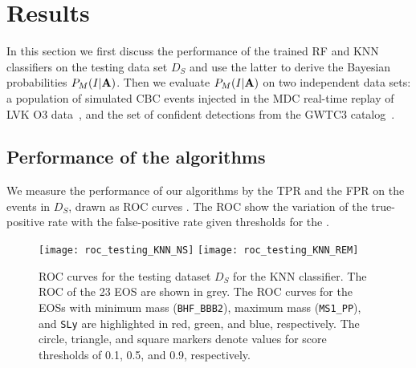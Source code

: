 \section{Results} \label{results}
In this section we first discuss the performance of the trained \ac{RF} and
\ac{KNN} classifiers on the testing data set $D_S$ and use the latter to derive
the Bayesian probabilities $P_M(I|{\bf A})$. Then we evaluate $P_M(I|{\bf A})$ on two independent data sets: a population of simulated \ac{CBC} events injected in the \ac{MDC} real-time replay of \ac{LVK} \ac{O3} data~\cite{Chaudhary:2023vec}, and the set of confident detections from the \ac{GWTC3} catalog~\cite{LIGOScientific:2021djp}. 

\subsection{Performance of the algorithms}
We measure the performance of our algorithms by the \ac{TPR} and the \ac{FPR} on the events in $D_S$, drawn as \ac{ROC} curves . The \ac{ROC} show the variation of the true-positive rate with the false-positive rate given thresholds for the .  

\begin{figure}[h]
\texttt{[image: roc\_testing\_KNN\_NS]}
\texttt{[image: roc\_testing\_KNN\_REM]}
\caption{\ac{ROC} curves for the testing dataset $D_S$ for the \ac{KNN} classifier. The \ac{ROC} of the 23 \ac{EOS} are shown in grey. The \ac{ROC} curves for the \ac{EOS}s with minimum mass ({\tt BHF\_BBB2}), maximum mass ({\tt MS1\_PP}), and {\tt SLy} are highlighted in red, green, and blue, respectively. The circle, triangle, and square markers denote values for score thresholds of 0.1, 0.5, and 0.9, respectively.}
\label{fig:rocO2_KNN}
\end{figure}

